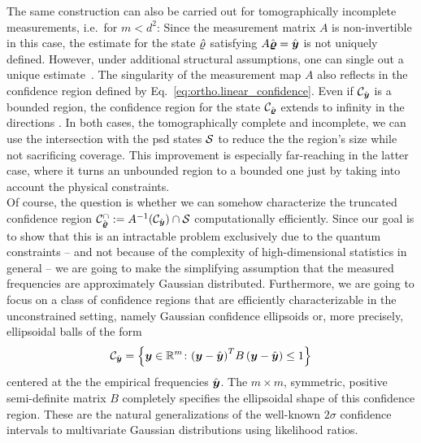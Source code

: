 The same construction can also be carried out for tomographically incomplete measurements, i.e.\ for $m<d^{2}$:
Since the measurement matrix $A$ is non-invertible in this case, the estimate for the state $\hat{\varrho}$ satisfying $A\hat{\boldsymbol{\varrho}} = \hat{\boldsymbol{y}}$ is not uniquely defined.
However, under additional structural assumptions, one can single out a unique estimate~\cite{Gross_2010_Quantum,Flammia_2012_Quantum}.
The singularity of the measurement map $A$ also reflects in the confidence region defined by Eq.~\eqref{eq:ortho.linear_confidence}.
Even if $\mathcal{C}_{\hat{\boldsymbol{y}}}$ is a bounded region, the confidence region for the state $\mathcal{C}_{\hat{\boldsymbol{\varrho}}}$ extends to infinity in the directions .
In both cases, the tomographically complete and incomplete, we can use the intersection with the psd states $\mathcal{S}$ to reduce the the region's size while not sacrificing coverage.
This improvement is especially far-reaching in the latter case, where it turns an unbounded region to a bounded one just by taking into account the physical constraints.\\


Of course, the question is whether we can somehow characterize the truncated confidence region $\mathcal{C}_{\hat{\boldsymbol{\varrho}}}^\cap := A^{-1}(\mathcal{C}_{\hat{\boldsymbol{y}}}) \cap \mathcal{S}$ computationally efficiently.
Since our goal is to show that this is an intractable problem exclusively due to the quantum constraints -- and not because of the complexity of high-dimensional statistics in general -- we are going to make the simplifying assumption that the measured frequencies are approximately Gaussian distributed.
Furthermore, we are going to focus on a class of confidence regions that are efficiently characterizable in the unconstrained setting, namely Gaussian confidence ellipsoids or, more precisely, ellipsoidal balls of the form
\[
  \mathcal{C}_{\hat{\boldsymbol{y}}} = \left\{ \boldsymbol{y} \in \mathbb{R}^m\colon  {\left(\boldsymbol{y}-\hat{\boldsymbol{y}}\right)}^T B\left(\boldsymbol{y}-\hat{\boldsymbol{y}}\right) \leq 1  \right\}
  \label{eq:ortho.confelip}
\]
centered at the the empirical frequencies  $\hat{\boldsymbol{y}}$.
The $m\times m$, symmetric, positive semi-definite matrix $B$ completely specifies the ellipsoidal shape of this confidence region.
These are the natural generalizations of the well-known $2\sigma$ confidence intervals to multivariate Gaussian distributions using likelihood ratios.


